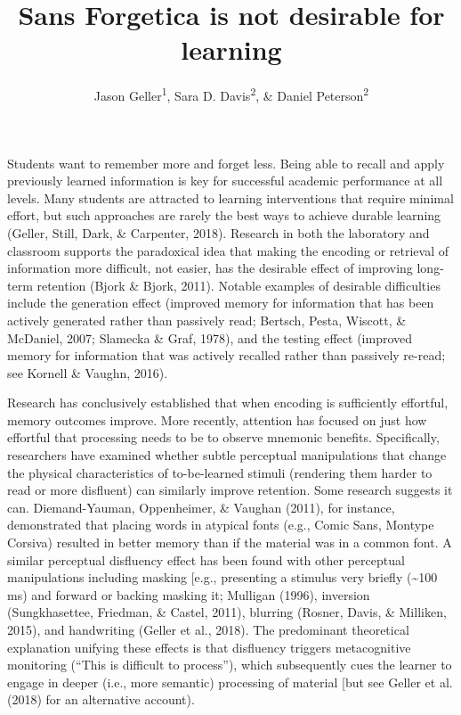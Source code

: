 \documentclass[jou]{apa6}
\affiliation{
\vspace{0.5cm}
\textsuperscript{1} University of Iowa\\\textsuperscript{2} Skidmore College}
\title{Sans Forgetica is not desirable for learning}
\author{Jason Geller\textsuperscript{1}, Sara D. Davis\textsuperscript{2}, \& Daniel Peterson\textsuperscript{2}}
\date{}
\begin{document}
\maketitle

Students want to remember more and forget less. Being able to recall and apply previously learned information is key for successful academic performance at all levels. Many students are attracted to learning interventions that require minimal effort, but such approaches are rarely the best ways to achieve durable learning (Geller, Still, Dark, \& Carpenter, 2018). Research in both the laboratory and classroom supports the paradoxical idea that making the encoding or retrieval of information more difficult, not easier, has the desirable effect of improving long-term retention (Bjork \& Bjork, 2011). Notable examples of desirable difficulties include the generation effect (improved memory for information that has been actively generated rather than passively read; Bertsch, Pesta, Wiscott, \& McDaniel, 2007; Slamecka \& Graf, 1978), and the testing effect (improved memory for information that was actively recalled rather than passively re-read; see Kornell \& Vaughn, 2016).

Research has conclusively established that when encoding is sufficiently effortful, memory outcomes improve. More recently, attention has focused on just how effortful that processing needs to be to observe mnemonic benefits. Specifically, researchers have examined whether subtle perceptual manipulations that change the physical characteristics of to-be-learned stimuli (rendering them harder to read or more disfluent) can similarly improve retention. Some research suggests it can. Diemand-Yauman, Oppenheimer, \& Vaughan (2011), for instance, demonstrated that placing words in atypical fonts (e.g., Comic Sans, Montype Corsiva) resulted in better memory than if the material was in a common font. A similar perceptual disfluency effect has been found with other perceptual manipulations including masking {[}e.g., presenting a stimulus very briefly (\textasciitilde{}100 ms) and forward or backing masking it; Mulligan (1996), inversion (Sungkhasettee, Friedman, \& Castel, 2011), blurring (Rosner, Davis, \& Milliken, 2015), and handwriting (Geller et al., 2018). The predominant theoretical explanation unifying these effects is that disfluency triggers metacognitive monitoring (\enquote{This is difficult to process}), which subsequently cues the learner to engage in deeper (i.e., more semantic) processing of material {[}but see Geller et al. (2018) for an alternative account).
\end{document}
